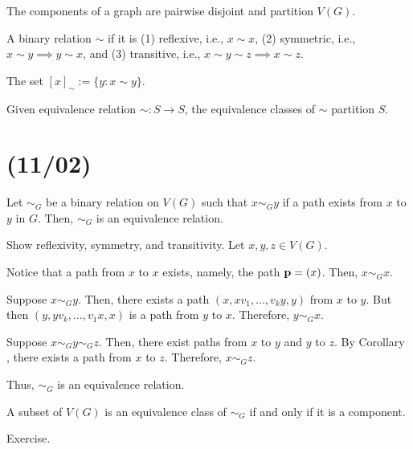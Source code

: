 \documentclass[class=math239,notes,tikz]{agony}
\begin{document}
\begin{theorem}
  The components of a graph are pairwise disjoint and partition $V(G)$.
\end{theorem}

\begin{defn}
  A binary relation $\sim$ if it is (1) reflexive, i.e., $x \sim x$,
  (2) symmetric, i.e., $x \sim y \implies y \sim x$,
  and (3) transitive, i.e., $x \sim y \sim z \implies x \sim z$.
\end{defn}

\begin{defn}
  The set $[x]_\sim := \{y : x \sim y\}$.
\end{defn}

\begin{prop}
  Given equivalence relation $\sim : S \to S$,
  the equivalence classes of $\sim$ partition $S$.
\end{prop}

\section{(11/02)}

\begin{theorem}\label{thm:patheq}
  Let $\sim_G$ be a binary relation on $V(G)$ 
  such that $x \sim_G y$ if a path exists from $x$ to $y$ in $G$.
  Then, $\sim_G$ is an equivalence relation.
\end{theorem}
\begin{prf}
  Show reflexivity, symmetry, and transitivity.
  Let $x,y,z \in V(G)$.

  Notice that a path from $x$ to $x$ exists, namely, the path $\vb p = (x)$.
  Then, $x \sim_G x$.

  Suppose $x \sim_G y$.
  Then, there exists a path $(x,xv_1,\dotsc,v_ky,y)$ from $x$ to $y$.
  But then $(y,yv_k,\dotsc,v_1x,x)$ is a path from $y$ to $x$.
  Therefore, $y \sim_G x$.

  Suppose $x \sim_G y \sim_G z$.
  Then, there exist paths from $x$ to $y$ and $y$ to $z$.
  By Corollary , there exists a path from $x$ to $z$.
  Therefore, $x \sim_G z$.

  Thus, $\sim_G$ is an equivalence relation.
\end{prf}
\begin{corollary}
  A subset of $V(G)$ is an equivalence class of $\sim_G$
  if and only if it is a component.
\end{corollary}
\begin{prf}
  Exercise.
\end{prf}
\end{document}
